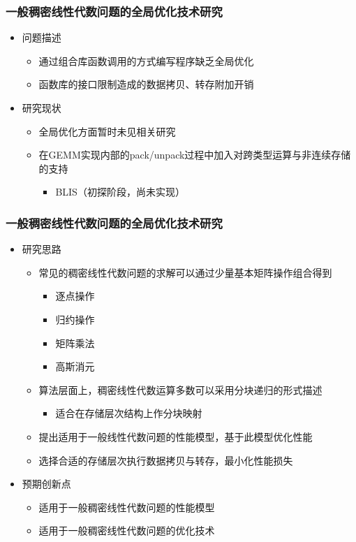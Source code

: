 \documentclass[aspectratio=169]{beamer}
\begin{document}
\begin{frame}
  \frametitle{一般稠密线性代数问题的全局优化技术研究}
  \begin{itemize}
  \item 问题描述
    \begin{itemize}
    \item 通过组合库函数调用的方式编写程序缺乏全局优化
    \item 函数库的接口限制造成的数据拷贝、转存附加开销
    \end{itemize}
  \item 研究现状
    \begin{itemize}
    \item 全局优化方面暂时未见相关研究
    \item 在GEMM实现内部的pack/unpack过程中加入对跨类型运算与非连续存储的支持
      \begin{itemize}
      \item BLIS（初探阶段，尚未实现）
      \end{itemize}
    \end{itemize}
  \end{itemize}
\end{frame}

\begin{frame}
  \frametitle{一般稠密线性代数问题的全局优化技术研究}
  \begin{itemize}
  \item 研究思路
    \begin{itemize}
    \item 常见的稠密线性代数问题的求解可以通过少量基本矩阵操作组合得到
      \begin{itemize}
      \item 逐点操作
      \item 归约操作
      \item 矩阵乘法
      \item 高斯消元
      \end{itemize}
    \item 算法层面上，稠密线性代数运算多数可以采用分块递归的形式描述
      \begin{itemize}
      \item 适合在存储层次结构上作分块映射
      \end{itemize}
    \item 提出适用于一般线性代数问题的性能模型，基于此模型优化性能
    \item 选择合适的存储层次执行数据拷贝与转存，最小化性能损失
    \end{itemize}
  \item 预期创新点
    \begin{itemize}
    \item 适用于一般稠密线性代数问题的性能模型
    \item 适用于一般稠密线性代数问题的优化技术
    \end{itemize}
  \end{itemize}
\end{frame}
\end{document}
